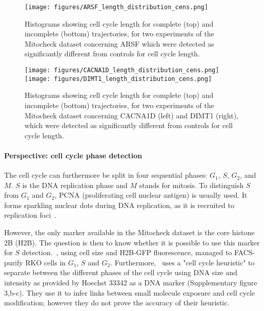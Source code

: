 \begin{figure*}[ht!]
\centerline{\texttt{[image: figures/ARSF\_length\_distribution\_cens.png]}}
\caption{Histograms showing cell cycle length for complete (top) and incomplete (bottom) trajectories, for two experiments of the Mitocheck dataset concerning ARSF which were detected as significantly different from controls for cell cycle length.}
\label{ARSF}
\end{figure*}
\begin{figure*}[ht!]
\centerline{\texttt{[image: figures/CACNA1D\_length\_distribution\_cens.png]}
\texttt{[image: figures/DIMT1\_length\_distribution\_cens.png]}
}
\caption{Histograms showing cell cycle length for complete (top) and incomplete (bottom) trajectories, for two experiments of the Mitocheck dataset concerning CACNA1D (left) and DIMT1 (right), which were detected as significantly different from controls for cell cycle length.}
\label{CAC}
\end{figure*}

\paragraph{Perspective: cell cycle phase detection}
The cell cycle can furthermore be split in four sequential phases: $G_1$, $S$, $G_2$, and $M$. $S$ is the DNA replication phase and $M$ stands for mitosis. To distinguish $S$ from $G_1$ and $G_2$, PCNA (proliferating cell nuclear antigen) is usually used. It forms sparkling nuclear dots during DNA replication, as it is recruited to replication foci~\cite{pmid10769021}.

However, the only marker available in the Mitocheck dataset is the
core histone 2B (H2B). The question is then to know whether it is
possible to use this marker for $S$ detection.~\cite{pmid16765323},
using cell size and H2B-GFP fluorescence, managed to FACS-purify RKO
cells in $G_1$, $S$ and $G_2$. %
Furthermore,~\cite{pmid17401369} uses a "cell cycle heuristic" to
 separate between the different phases of the cell cycle using DNA
 size and intensity as provided by Hoechst 33342 as a DNA marker
 (Supplementary figure 3,b-c). They use it to infer links between
 small molecule exposure and cell cycle modification; however they do
 not prove the accuracy of their heuristic. 

